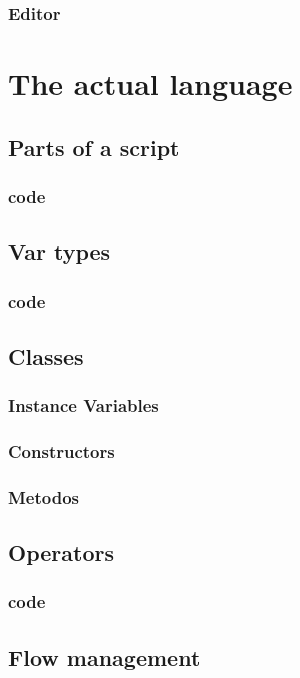 \documentclass[10pt]{book}
\begin{document}
\subsection{Editor}
\lipsum[16]

%
\chapter{The actual language}
\lipsum[16]

\section{Parts of a script}
\lipsum[17]
\subsection{code}
\lipsum[18]

\section{Var types}
\lipsum[19]
\subsection{code}
\lipsum[20]

\section{Classes}
\lipsum[21]
\subsection{Instance Variables}
\lipsum[22]
\subsection{Constructors}
\lipsum[23]
\subsection{Metodos}
\lipsum[24]

\section{Operators}
\lipsum[25]
\subsection{code}
\lipsum[26]

\section{Flow management}
\lipsum[27]
\end{document}
